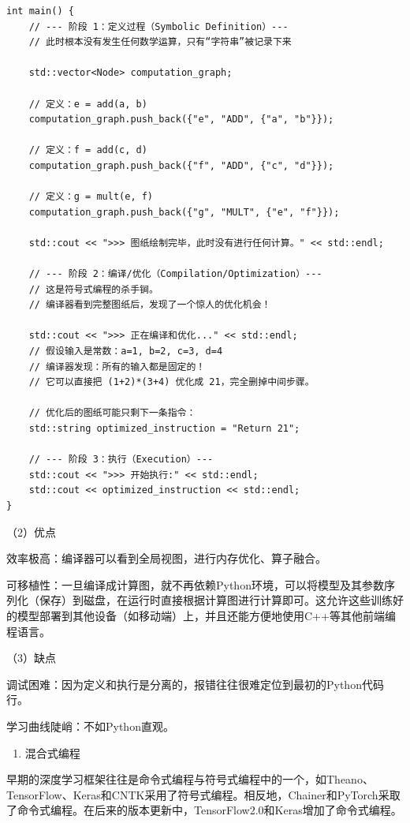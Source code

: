 \begin{verbatim}
int main() {
    // --- 阶段 1：定义过程（Symbolic Definition）---
    // 此时根本没有发生任何数学运算，只有“字符串”被记录下来

    std::vector<Node> computation_graph;

    // 定义：e = add(a, b)
    computation_graph.push_back({"e", "ADD", {"a", "b"}});

    // 定义：f = add(c, d)
    computation_graph.push_back({"f", "ADD", {"c", "d"}});

    // 定义：g = mult(e, f)
    computation_graph.push_back({"g", "MULT", {"e", "f"}});

    std::cout << ">>> 图纸绘制完毕，此时没有进行任何计算。" << std::endl;

    // --- 阶段 2：编译/优化（Compilation/Optimization）---
    // 这是符号式编程的杀手锏。
    // 编译器看到完整图纸后，发现了一个惊人的优化机会！

    std::cout << ">>> 正在编译和优化..." << std::endl;
    // 假设输入是常数：a=1, b=2, c=3, d=4
    // 编译器发现：所有的输入都是固定的！
    // 它可以直接把 (1+2)*(3+4) 优化成 21，完全删掉中间步骤。

    // 优化后的图纸可能只剩下一条指令：
    std::string optimized_instruction = "Return 21";

    // --- 阶段 3：执行（Execution）---
    std::cout << ">>> 开始执行:" << std::endl;
    std::cout << optimized_instruction << std::endl;
}
\end{verbatim}

（2）优点

效率极高：编译器可以看到全局视图，进行内存优化、算子融合。

可移植性：一旦编译成计算图，就不再依赖Python环境，可以将模型及其参数序列化（保存）到磁盘，在运行时直接根据计算图进行计算即可。这允许这些训练好的模型部署到其他设备（如移动端）上，并且还能方便地使用C++等其他前端编程语言。

（3）缺点

调试困难：因为定义和执行是分离的，报错往往很难定位到最初的Python代码行。

学习曲线陡峭：不如Python直观。

\begin{enumerate}
\def\labelenumi{\arabic{enumi}.}
\setcounter{enumi}{2}
\tightlist
\item
  混合式编程
\end{enumerate}

早期的深度学习框架往往是命令式编程与符号式编程中的一个，如Theano、TensorFlow、Keras和CNTK采用了符号式编程。相反地，Chainer和PyTorch采取了命令式编程。在后来的版本更新中，TensorFlow2.0和Keras增加了命令式编程。

